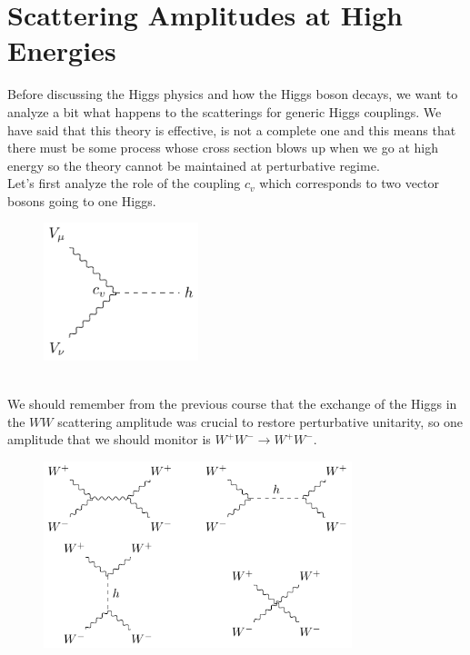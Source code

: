 \documentclass[../main.tex]{subfiles}
\begin{document}
\section{Scattering Amplitudes at High Energies}
Before discussing the Higgs physics and how the Higgs boson decays, we want to analyze a bit what happens to the scatterings for generic Higgs couplings. We have said that this theory is effective, is not a complete one and this means that there must be some process whose cross section blows up when we go at high energy so the theory cannot be maintained at perturbative regime.\\
Let's first analyze the role of the coupling $c_v$ which corresponds to two vector bosons going to one Higgs.\\
\begin{figure}[h]
    \centering
    \includegraphics[width=0.4\textwidth]{Images/cvvv.pdf}
    \caption*{}
\end{figure}\\
We should remember from the previous course that the exchange of the Higgs in the $WW$ scattering amplitude was crucial to restore perturbative unitarity, so one amplitude that we should monitor is $W^+W^-\to W^+W^-$.\\
\begin{figure}[h]
    \centering
    \includegraphics[width=0.8\textwidth]{Images/wwww.pdf}
    \caption*{}
\end{figure}\\
\end{document}
